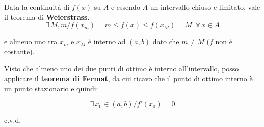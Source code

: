 \documentclass[../dimostrazioni]{subfiles}
\begin{document}
            Data la continuità di \(f(x)\) su \(A\) e essendo \(A\) un intervallo chiuso e limitato, vale il teorema di \textbf{Weierstrass}.
            \[ \exists \, M, m / f(x_m)=m \leqslant f(x) \leqslant f(x_M) = M \, \, \, \forall \, x \in A \]

            e almeno uno tra \(x_m\) e \(x_M\) è interno ad \( (a,b) \) dato che \( m \neq M \) (\( f \) non è costante).

            Visto che almeno uno dei due punti di ottimo è interno all'intervallo, posso applicare il \textbf{\hyperref[teoFermat]{teorema di Fermat}}, da cui ricavo che il punto di ottimo interno è un punto stazionario e quindi:

            \[\exists \, x_0 \in (a,b) / f'(x_0) = 0 \]
            
            c.v.d.

    
\end{document}
